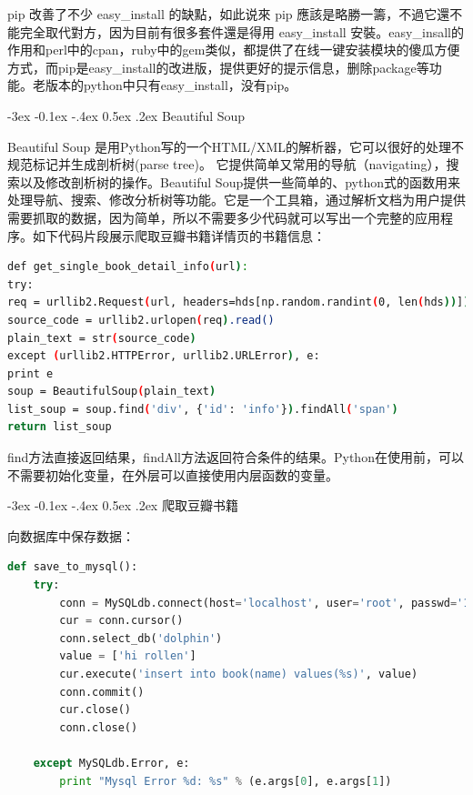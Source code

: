 \documentclass[12pt]{book}
\makeatletter
\numberwithin{dummy}{section}
\theoremstyle{ocrenumbox}
\theoremstyle{blacknumex}
\theoremstyle{blacknumbox}
\theoremstyle{ocrenum}
\renewcommand{\subsection}{\@startsection {subsection}{2}{\z@}
	{-3ex \@plus -0.1ex \@minus -.4ex}
	{0.5ex \@plus.2ex }
	{\normalfont\sffamily\bfseries}}
\makeatother
\begin{document}
pip 改善了不少 easy\_install 的缺點，如此说來 pip 應該是略勝一籌，不過它還不能完全取代對方，因为目前有很多套件還是得用 easy\_install 安裝。easy\_insall的作用和perl中的cpan，ruby中的gem类似，都提供了在线一键安装模块的傻瓜方便方式，而pip是easy\_install的改进版，提供更好的提示信息，删除package等功能。老版本的python中只有easy\_install，没有pip。

\subsection{Beautiful Soup}

Beautiful Soup 是用Python写的一个HTML/XML的解析器，它可以很好的处理不规范标记并生成剖析树(parse tree)。 它提供简单又常用的导航（navigating），搜索以及修改剖析树的操作。Beautiful Soup提供一些简单的、python式的函数用来处理导航、搜索、修改分析树等功能。它是一个工具箱，通过解析文档为用户提供需要抓取的数据，因为简单，所以不需要多少代码就可以写出一个完整的应用程序。如下代码片段展示爬取豆瓣书籍详情页的书籍信息：

\begin{lstlisting}[language=Bash]
def get_single_book_detail_info(url):
try:
req = urllib2.Request(url, headers=hds[np.random.randint(0, len(hds))])
source_code = urllib2.urlopen(req).read()
plain_text = str(source_code)
except (urllib2.HTTPError, urllib2.URLError), e:
print e
soup = BeautifulSoup(plain_text)
list_soup = soup.find('div', {'id': 'info'}).findAll('span')
return list_soup
\end{lstlisting}

find方法直接返回结果，findAll方法返回符合条件的结果。Python在使用前，可以不需要初始化变量，在外层可以直接使用内层函数的变量。

\subsection{爬取豆瓣书籍}

向数据库中保存数据：

\begin{lstlisting}[language=Python]
def save_to_mysql():
	try:
		conn = MySQLdb.connect(host='localhost', user='root', passwd='123456', port=3306)
		cur = conn.cursor()
		conn.select_db('dolphin')
		value = ['hi rollen']
		cur.execute('insert into book(name) values(%s)', value)
		conn.commit()
		cur.close()
		conn.close()
	
	except MySQLdb.Error, e:
		print "Mysql Error %d: %s" % (e.args[0], e.args[1])
\end{lstlisting}
\end{document}
